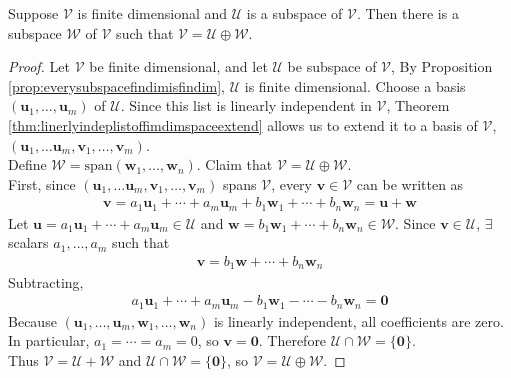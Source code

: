 \begin{proposition} Suppose $\mathcal{V}$ is finite dimensional and $\mathcal{U}$ is a subspace of $\mathcal{V}$. Then there is a subspace $\mathcal{W}$ of $\mathcal{V}$ such that $\mathcal{V} = \mathcal{U} \oplus \mathcal{W}$.
\begin{proof} Let $\mathcal{V}$ be finite dimensional, and let $\mathcal{U}$ be subspace of $\mathcal{V}$, By Proposition \ref{prop:everysubspacefindimisfindim}, $\mathcal{U}$ is finite dimensional. Choose a basis $(\mathbf{u}_1, \ldots, \mathbf{u}_m)$ of $\mathcal{U}$. Since this list is linearly independent in $\mathcal{V}$, Theorem \ref{thm:linerlyindeplistoffimdimspaceextend} allows us to extend it to a basis of $\mathcal{V}$, $(\mathbf{u}_1, \ldots \mathbf{u}_m, \mathbf{v}_1, \ldots, \mathbf{v}_m)$.\\
Define $\mathcal{W} = \text{span}(\mathbf{w}_1, \ldots, \mathbf{w}_n)$. Claim that $\mathcal{V} = \mathcal{U} \oplus \mathcal{W}$.\\
First, since $(\mathbf{u}_1, \ldots \mathbf{u}_m, \mathbf{v}_1, \ldots, \mathbf{v}_m)$ spans $\mathcal{V}$, every $\mathbf{v} \in \mathcal{V}$ can be written as 
\begin{align}
\mathbf{v} = a_1 \mathbf{u}_1 + \cdots + a_m \mathbf{u}_m + b_1 \mathbf{w}_1 + \cdots + b_n \mathbf{w}_n = \mathbf{u} + \mathbf{w} \nonumber
\end{align}
Let $\mathbf{u} = a_1 \mathbf{u}_1 + \cdots + a_m \mathbf{u}_m \in \mathcal{U}$ and $\mathbf{w} = b_1 \mathbf{w}_1 + \cdots + b_n \mathbf{w}_n \in \mathcal{W}$. Since $\mathbf{v} \in \mathcal{U}$, $\exists$ scalars $a_1, \ldots, a_m$ such that
\begin{align}
\mathbf{v} = b_1 \mathbf{w} + \cdots + b_n \mathbf{w}_n \nonumber
\end{align}
Subtracting,
\begin{align}
a_1 \mathbf{u}_1 + \cdots + a_m \mathbf{u}_m - b_1 \mathbf{w}_1 - \cdots - b_n \mathbf{w}_n = \mathbf{0} \nonumber
\end{align}
Because $(\mathbf{u}_1, \ldots, \mathbf{u}_m, \mathbf{w}_1, \ldots, \mathbf{w}_n)$ is linearly independent, all coefficients are zero.\\
In particular, $a_1 = \cdots = a_m = 0$, so $\mathbf{v} = \mathbf{0}$. Therefore $\mathcal{U} \cap \mathcal{W} = \{ \mathbf{0} \}$.\\
Thus $\mathcal{V} = \mathcal{U} + \mathcal{W}$ and $\mathcal{U} \cap \mathcal{W} = \{ \mathbf{0} \}$, so $\mathcal{V} = \mathcal{U} \oplus \mathcal{W}$.
\end{proof}
\end{proposition}

